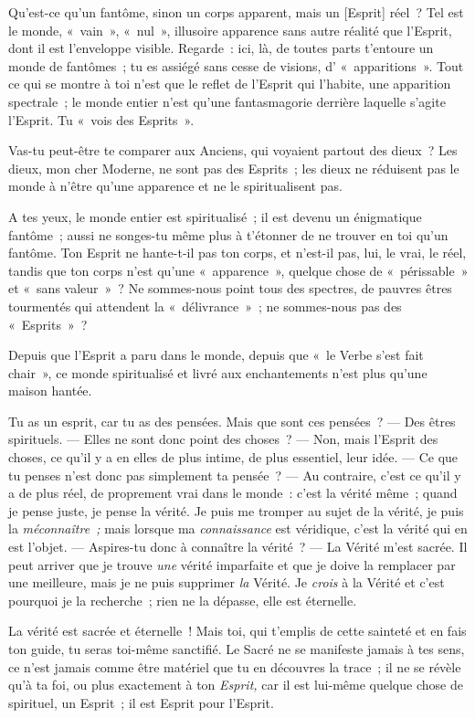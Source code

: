 \documentclass[french,twoside]{book} %
\newcommand\corr[1]{#1}
\begin{document}
Qu’est-ce qu’un fantôme, sinon un corps apparent, mais un [{\corr Esprit}] réel ? Tel est le monde, « vain », « nul », illusoire apparence sans autre réalité que l’Esprit, dont il est l’enveloppe visible. Regarde : ici, là, de toutes parts t’entoure un monde de fantômes ; tu es assiégé sans cesse de visions, d’ « apparitions ». Tout ce qui se montre à toi n’est que le reflet de l’Esprit qui l’habite, une apparition spectrale ; le monde entier n’est qu’une fantasmagorie derrière laquelle s’agite l’Esprit. Tu « vois des Esprits ».\par
Vas-tu peut-être te comparer aux Anciens, qui voyaient partout des dieux ? Les dieux, mon cher Moderne, ne sont pas des Esprits ; les dieux ne réduisent  pas le monde à n’être qu’une apparence et ne le spiritualisent pas.\par
A tes yeux, le monde entier est spiritualisé ; il est devenu un énigmatique fantôme ; aussi ne songes-tu même plus à t’étonner de ne trouver en toi qu’un fantôme. Ton Esprit ne hante-t-il pas ton corps, et n’est-il pas, lui, le vrai, le réel, tandis que ton corps n’est qu’une « apparence », quelque chose de « périssable » et « sans valeur » ? Ne sommes-nous point tous des spectres, de pauvres êtres tourmentés qui attendent la « délivrance » ; ne sommes-nous pas des « Esprits » ?\par
Depuis que l’Esprit a paru dans le monde, depuis que « le Verbe s’est fait chair », ce monde spiritualisé et livré aux enchantements n’est plus qu’une maison hantée.\par
Tu as un esprit, car tu as des pensées. Mais que sont ces pensées ? — Des êtres spirituels. — Elles ne sont donc point des choses ? — Non, mais l’Esprit des choses, ce qu’il y a en elles de plus intime, de plus essentiel, leur idée. — Ce que tu penses n’est donc pas simplement ta pensée ? — Au contraire, c’est ce qu’il y a de plus réel, de proprement vrai dans le monde : c’est la vérité même ; quand je pense juste, je pense la vérité. Je puis me tromper au sujet de la vérité, je puis la \emph{méconnaître ;} mais lorsque ma \emph{connaissance} est véridique, c’est la vérité qui en est l’objet. — Aspires-tu donc à connaître la vérité ? — La Vérité m’est sacrée. Il peut arriver que je trouve \emph{une} vérité imparfaite et que je doive la remplacer par une meilleure, mais je ne puis supprimer \emph{la }Vérité. Je \emph{crois} à la Vérité et c’est pourquoi je la recherche ; rien ne la dépasse, elle est éternelle.\par
La vérité est sacrée et éternelle ! Mais toi, qui t’emplis de cette sainteté et en fais ton guide, tu seras toi-même sanctifié. Le Sacré ne se manifeste jamais à tes sens, ce n’est jamais comme être matériel que tu en découvres la trace ; il ne se révèle qu’à ta foi, ou  plus exactement à ton \emph{Esprit,} car il est lui-même quelque chose de spirituel, un Esprit ; il est Esprit pour l’Esprit.\par
\end{document}
